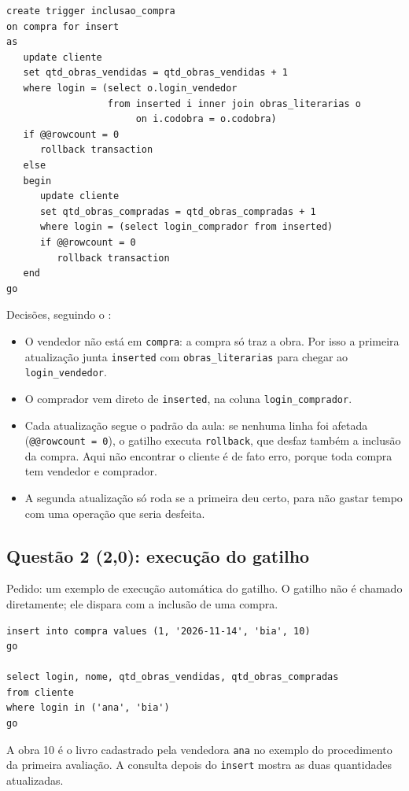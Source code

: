 \begin{lstlisting}
create trigger inclusao_compra
on compra for insert
as
   update cliente
   set qtd_obras_vendidas = qtd_obras_vendidas + 1
   where login = (select o.login_vendedor
                  from inserted i inner join obras_literarias o
                       on i.codobra = o.codobra)
   if @@rowcount = 0
      rollback transaction
   else
   begin
      update cliente
      set qtd_obras_compradas = qtd_obras_compradas + 1
      where login = (select login_comprador from inserted)
      if @@rowcount = 0
         rollback transaction
   end
go
\end{lstlisting}

Decisões, seguindo o :

\begin{itemize}
	\item O vendedor não está em \texttt{compra}: a compra só traz a obra.
	Por isso a primeira atualização junta \texttt{inserted} com
	\texttt{obras\_literarias} para chegar ao \texttt{login\_vendedor}.
	\item O comprador vem direto de \texttt{inserted}, na coluna
	\texttt{login\_comprador}.
	\item Cada atualização segue o padrão da aula: se nenhuma linha foi
	afetada (\texttt{@@rowcount = 0}), o gatilho executa
	\texttt{rollback}, que desfaz também a inclusão da compra. Aqui não
	encontrar o cliente é de fato erro, porque toda compra tem vendedor e
	comprador.
	\item A segunda atualização só roda se a primeira deu certo, para não
	gastar tempo com uma operação que seria desfeita.
\end{itemize}

\subsection{Questão 2 (2,0): execução do gatilho}

Pedido: um exemplo de execução automática do gatilho. O gatilho não é
chamado diretamente; ele dispara com a inclusão de uma compra.

\begin{lstlisting}
insert into compra values (1, '2026-11-14', 'bia', 10)
go

select login, nome, qtd_obras_vendidas, qtd_obras_compradas
from cliente
where login in ('ana', 'bia')
go
\end{lstlisting}

A obra 10 é o livro cadastrado pela vendedora \texttt{ana} no exemplo do
procedimento da primeira avaliação. A consulta depois do \texttt{insert}
mostra as duas quantidades atualizadas.

